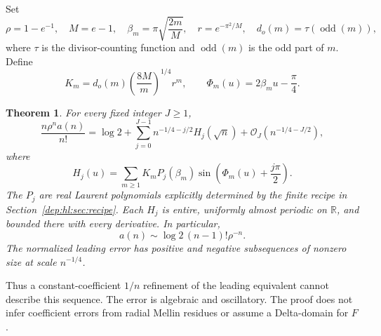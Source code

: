 \documentclass[11pt]{article}
\newtheorem{theorem}{Theorem}[section]
\theoremstyle{definition}\newtheorem{definition}[theorem]{Definition}
\theoremstyle{remark}\newtheorem{remark}[theorem]{Remark}
\newcommand{\OO}{\mathcal O}
\newcommand{\odd}{\operatorname{odd}}
\newcommand{\RR}{\mathbb R}
\begin{document}
Set
\begin{equation}\label{dep:hl:eq:constants}
 \rho=1-e^{-1},\quad M=e-1,\quad
 \beta_m=\pi\sqrt{\frac{2m}{M}},\quad r=e^{-\pi^2/M},\quad
 d_o(m)=\tau(\odd(m)),
\end{equation}
where $\tau$ is the divisor-counting function and $\odd(m)$ is the odd
part of $m$. Define
\begin{equation}\label{dep:hl:eq:mode}
 K_m=d_o(m)\left(\frac{8M}{m}\right)^{1/4}r^m,
 \qquad \Phi_m(u)=2\beta_m u-\frac\pi4.
\end{equation}
\begin{theorem}\label{dep:hl:thm:main}
For every fixed integer $J\ge1$,
\begin{equation}\label{dep:hl:eq:main}
 \frac{n\rho^n a(n)}{n!}
 =\log 2+\sum_{j=0}^{J-1}n^{-1/4-j/2}H_j(\sqrt n)
       +\OO_J(n^{-1/4-J/2}),
\end{equation}
where
\begin{equation}\label{dep:hl:eq:H}
 H_j(u)=\sum_{m\ge1}K_mP_j(\beta_m)
              \sin\left(\Phi_m(u)+\frac{j\pi}{2}\right).
\end{equation}
The $P_j$ are real Laurent polynomials explicitly determined by the
finite recipe in Section~\ref{dep:hl:sec:recipe}. Each $H_j$ is entire, uniformly
almost periodic on $\RR$, and bounded there with every derivative.
In particular,
\begin{equation}\label{dep:hl:eq:equiv}
 a(n)\sim \log 2\,(n-1)!\rho^{-n}.
\end{equation}
The normalized leading error has positive and negative subsequences of
nonzero size at scale $n^{-1/4}$.
\end{theorem}
Thus a constant-coefficient $1/n$ refinement of the leading equivalent
cannot describe this sequence. The error is algebraic and oscillatory.
The proof does not infer coefficient errors from radial Mellin residues
or assume a Delta-domain for $F$.
\end{document}
